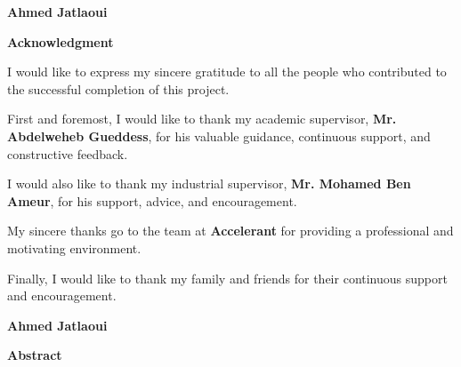 \documentclass[12pt,a4paper]{report}
\begin{document}
\vfill

\begin{flushright}
\Large \textbf{Ahmed Jatlaoui}
\end{flushright}


\cleardoublepage
\thispagestyle{empty}

\begin{center}
{\LARGE \textbf{Acknowledgment}}
\end{center}

\vspace{1cm}

\linespread{1.3}\selectfont
\large

I would like to express my sincere gratitude to all the people who contributed to the successful completion of this project.

\vspace{1cm}

First and foremost, I would like to thank my academic supervisor, \textbf{Mr. Abdelweheb Gueddess}, for his valuable guidance, continuous support, and constructive feedback.

\vspace{1cm}

I would also like to thank my industrial supervisor, \textbf{Mr. Mohamed Ben Ameur}, for his support, advice, and encouragement.

\vspace{1cm}

My sincere thanks go to the team at \textbf{Accelerant} for providing a professional and motivating environment.

\vspace{1cm}

Finally, I would like to thank my family and friends for their continuous support and encouragement.

\vfill

\begin{flushright}
\Large \textbf{Ahmed Jatlaoui}
\end{flushright}


\cleardoublepage
\thispagestyle{empty}

\begin{center}
{\LARGE \textbf{Abstract}}
\end{center}

\vspace{1cm}

\linespread{1.3}\selectfont
\large
\end{document}
